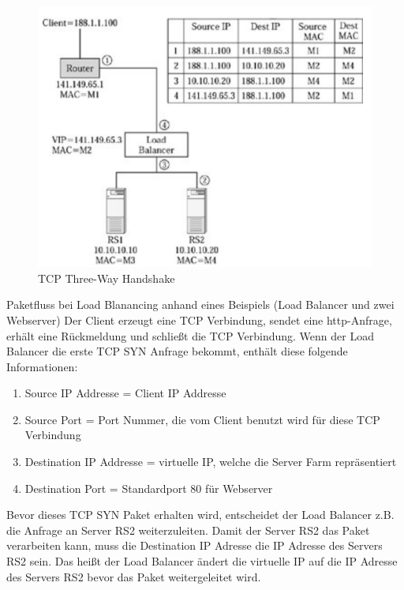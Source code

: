 \pagebreak
\begin{figure}[!h]
	\begin{center}
		\includegraphics[width=0.5\linewidth]{images/loadbalancing10.jpg}
		\caption{TCP Three-Way Handshake \cite{LoadBalancing2}}
		\label{TCP Three-Way Handshake_2}
	\end{center}
\end{figure}
Paketfluss bei Load Blanancing anhand eines Beispiels (Load Balancer und zwei Webserver)
Der Client erzeugt eine TCP Verbindung, sendet eine http-Anfrage, erhält eine Rückmeldung und schließt die TCP Verbindung. Wenn der Load Balancer die erste TCP SYN Anfrage bekommt, enthält diese folgende Informationen:
\begin{enumerate}
\item Source IP Addresse = Client IP Addresse
\item Source Port = Port Nummer, die vom Client benutzt wird für diese TCP Verbindung
\item Destination IP Addresse = virtuelle IP, welche die Server Farm repräsentiert
\item Destination Port = Standardport 80 für Webserver
\end{enumerate}
Bevor dieses TCP SYN Paket erhalten wird, entscheidet der Load Balancer z.B. die Anfrage an Server RS2 weiterzuleiten. Damit der Server RS2 das Paket verarbeiten kann, muss die Destination IP Adresse die IP Adresse des Servers RS2 sein. Das heißt der Load Balancer ändert die virtuelle IP auf die IP Adresse des Servers RS2 bevor das Paket weitergeleitet wird.   
